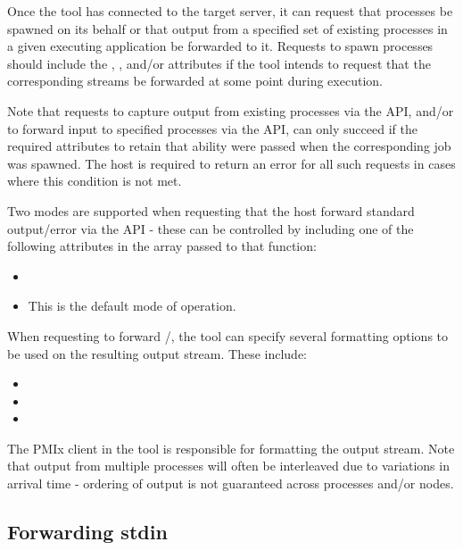 Once the tool has connected to the target server, it can request that
processes be spawned on its behalf or that output from a specified set of
existing processes in a given executing application be forwarded to it.
Requests to spawn processes should include the ,
, and/or  attributes if the
tool intends to request that the corresponding streams be forwarded at some
point during execution.

Note that requests to capture output from existing processes via the
 \ac{API}, and/or to forward input to specified
processes via the  \ac{API}, can only succeed if the
required attributes to retain that ability were passed when the corresponding
job was spawned. The host is required to return an error for all such requests
in cases where this condition is not met.

Two modes are supported when requesting that the host forward standard output/error via the  \ac{API} - these can be controlled by including one of the following attributes in the  array passed to that function:

\begin{itemize}
    \item {}
    \item {}This is the default mode of operation.
    \pasteAttributeItemEnd{}
\end{itemize}

When requesting to forward /, the tool can specify several formatting options to be used on the resulting output stream. These include:

\begin{itemize}
    \item {}
    \item {}
    \item {}
\end{itemize}

The \ac{PMIx} client in the tool is responsible for formatting the output stream. Note that output from multiple processes will often be interleaved due to variations in arrival time - ordering of output is not guaranteed across processes and/or nodes.

\subsection{Forwarding stdin}

